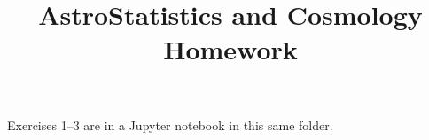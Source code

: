 \documentclass[11pt]{article}
\title{AstroStatistics and Cosmology Homework}
\begin{document}
\maketitle
\tableofcontents

Exercises 1--3 are in a Jupyter notebook in this same folder.



\printbibliography
\end{document}
